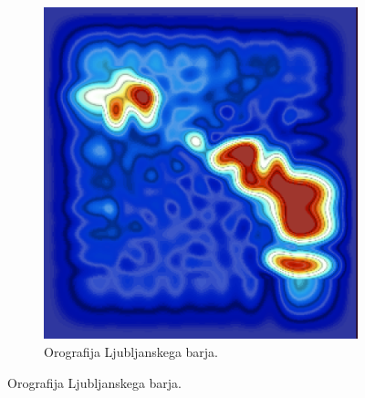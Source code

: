 \documentclass[mat2, tisk]{fmfdelo}
\begin{document}
\begin{figure}[h!]
\begin{subfigure}[b]{0.48\textwidth}
  \end{subfigure}\hfill
  \begin{subfigure}[b]{0.48\textwidth}
    \centering
    \includegraphics[width=\textwidth]{rezultati/barje_dem.png}
    \caption{Orografija Ljubljanskega barja.}
    \label{fig:barje}
  \end{subfigure}
  \label{fig:orography_sidebyside}
\end{figure}
\end{document}
